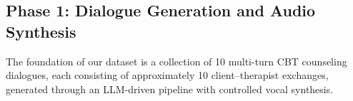 
\subsection{Phase 1: Dialogue Generation and Audio Synthesis}

The foundation of our dataset is a collection of 10 multi-turn CBT counseling dialogues, each consisting of approximately 10 client--therapist exchanges, generated through an LLM-driven pipeline with controlled vocal synthesis.

